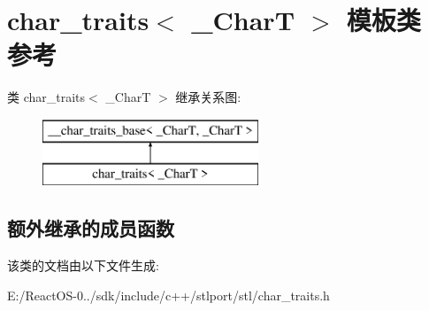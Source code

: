 \hypertarget{classchar__traits}{}\section{char\+\_\+traits$<$ \+\_\+\+CharT $>$ 模板类 参考}
\label{classchar__traits}
类 char\+\_\+traits$<$ \+\_\+\+CharT $>$ 继承关系图\+:\begin{figure}[H]
\begin{center}
\leavevmode
\includegraphics[height=2.000000cm]{classchar__traits}
\end{center}
\end{figure}
\subsection*{额外继承的成员函数}


该类的文档由以下文件生成\+:\begin{DoxyCompactItemize}
\item 
E\+:/\+React\+O\+S-\/0../sdk/include/c++/stlport/stl/char\+\_\+traits.\+h\end{DoxyCompactItemize}
